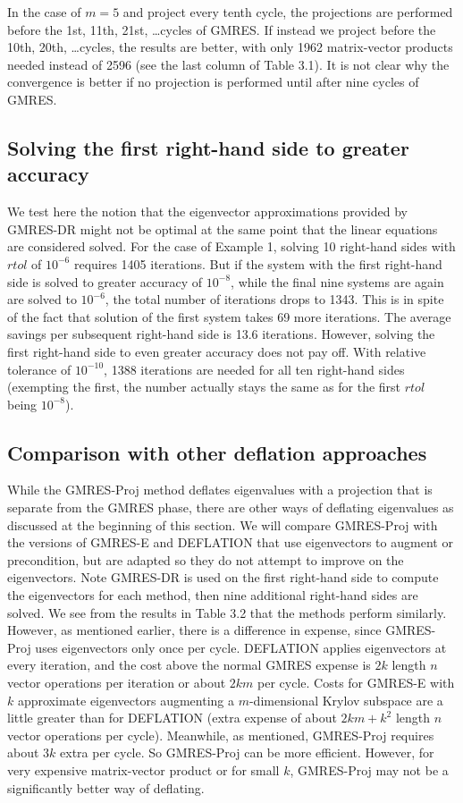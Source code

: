 \documentclass[final]{siamltex}
\begin{document}
In the case of $m=5$ and project every tenth cycle, the projections 
are performed before the 1st, 11th, 21st, \ldots cycles of GMRES.  If instead we project before the 10th, 20th, \ldots cycles, the results are better, with only 1962 matrix-vector products needed instead of 2596 (see the last column of Table 3.1).  It is not clear why the convergence is better if no projection is performed until after nine cycles of GMRES.   

\subsection{Solving the first right-hand side to greater accuracy}

We test here the notion that the eigenvector approximations provided by GMRES-DR might not be optimal at the same point that the linear equations are considered solved.  For the case of Example 1, solving 10 right-hand sides with $rtol$ of $10^{-6}$ requires 1405 iterations.  But if the system with the first right-hand side is solved to greater accuracy of $10^{-8}$, while the final nine systems are again are solved to $10^{-6}$, the total number of iterations drops to 1343.  This is in spite of the fact that solution of the first system takes 69 more iterations.  The average savings per subsequent right-hand side is 13.6 iterations.  However, solving the first right-hand side to even greater accuracy does not pay off.  With relative tolerance of $10^{-10}$, 1388 iterations are needed for all ten right-hand sides (exempting the first, the number actually stays the same as for the first $rtol$ being $10^{-8}$).

\subsection{Comparison with other deflation approaches}

While the GMRES-Proj method deflates eigenvalues with a projection that is separate from the GMRES phase, there are other ways of deflating eigenvalues as discussed at the beginning of this section.  We will compare GMRES-Proj with the versions of GMRES-E and DEFLATION that use eigenvectors to augment or precondition, but are adapted so they do not attempt to improve on the eigenvectors.  Note GMRES-DR is used on the first right-hand side to compute the eigenvectors for each method, then nine additional right-hand sides are solved.  We see from the results in Table 3.2 that the methods perform similarly.  However, as mentioned earlier, there is a difference in expense, since GMRES-Proj uses eigenvectors only once per cycle.  DEFLATION applies eigenvectors at every iteration, and the cost above the normal GMRES expense is $2k$ length $n$ vector operations per iteration or about $2km$ per cycle.  Costs for GMRES-E with $k$ approximate eigenvectors augmenting a $m$-dimensional Krylov subspace are a little greater than for DEFLATION (extra expense of about $2km + k^2$ length $n$ vector operations per cycle).   Meanwhile, as mentioned, GMRES-Proj requires about $3k$ extra per cycle.  So GMRES-Proj can be more efficient.  However, for very expensive matrix-vector product or for small $k$, GMRES-Proj may not be a significantly better way of deflating.
\end{document}

